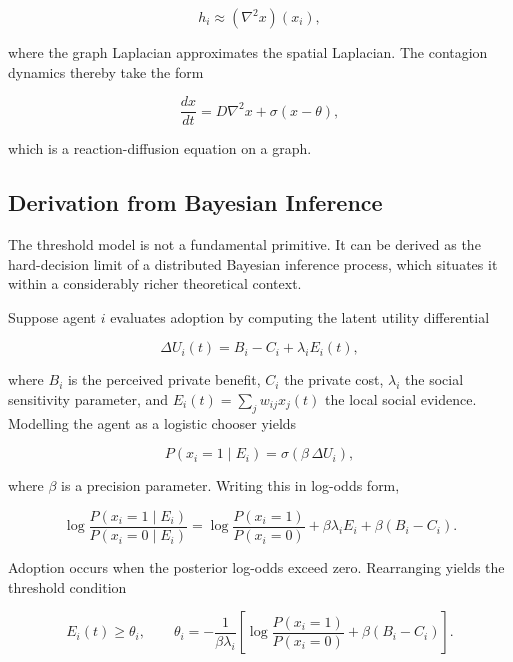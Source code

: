 \documentclass[12pt,a4paper]{article}
\theoremstyle{plain}
\theoremstyle{definition}
\begin{document}
\begin{equation}
h_i \approx (\nabla^2 x)(x_i),
\end{equation}

where the graph Laplacian approximates the spatial Laplacian. The contagion dynamics thereby take the form

\begin{equation}
\frac{dx}{dt} = D\nabla^2 x + \sigma(x - \theta),
\end{equation}

which is a reaction-diffusion equation on a graph.

\subsection{Derivation from Bayesian Inference}

The threshold model is not a fundamental primitive. It can be derived as the hard-decision limit of a distributed Bayesian inference process, which situates it within a considerably richer theoretical context.

Suppose agent $i$ evaluates adoption by computing the latent utility differential

\begin{equation}
\Delta U_i(t) = B_i - C_i + \lambda_i E_i(t),
\end{equation}

where $B_i$ is the perceived private benefit, $C_i$ the private cost, $\lambda_i$ the social sensitivity parameter, and $E_i(t) = \sum_j w_{ij} x_j(t)$ the local social evidence. Modelling the agent as a logistic chooser yields

\begin{equation}
P(x_i = 1 \mid E_i) = \sigma(\beta\, \Delta U_i),
\end{equation}

where $\beta$ is a precision parameter. Writing this in log-odds form,

\begin{equation}
\log \frac{P(x_i=1 \mid E_i)}{P(x_i=0 \mid E_i)}
=
\log \frac{P(x_i=1)}{P(x_i=0)}
+ \beta\lambda_i E_i
+ \beta(B_i - C_i).
\end{equation}

Adoption occurs when the posterior log-odds exceed zero. Rearranging yields the threshold condition

\begin{equation}
E_i(t) \geq \theta_i, \qquad
\theta_i = -\frac{1}{\beta\lambda_i}
\left[
\log \frac{P(x_i=1)}{P(x_i=0)} + \beta(B_i - C_i)
\right].
\end{equation}
\end{document}
